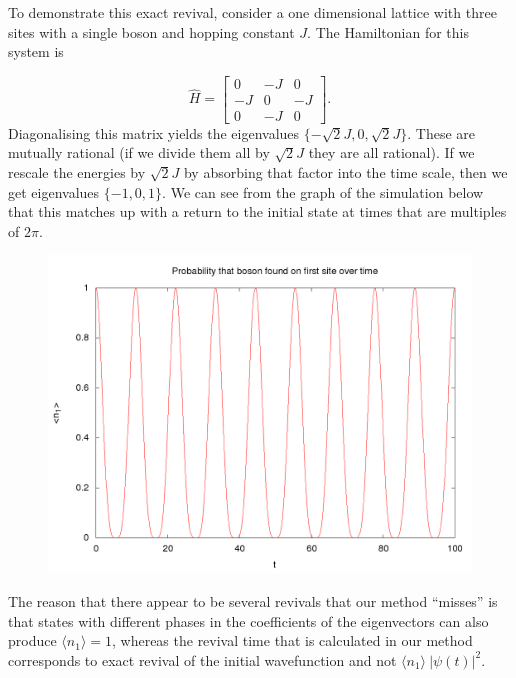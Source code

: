 \documentclass[a4paper,10pt]{article}
\begin{document}
To demonstrate this exact revival, consider a one dimensional lattice with three sites with a single boson and hopping constant $J$. The Hamiltonian for this system is

\begin{equation}
\hat{H}= \begin{bmatrix}
 0 & -J & 0 \\
 -J & 0 & -J\\
 0 & -J & 0
 \end{bmatrix}.
\end{equation}
Diagonalising this matrix yields the eigenvalues $\{-\sqrt{2}J,0,\sqrt{2}J\}$. These are mutually rational (if we divide them all by $\sqrt{2}J$ they are all rational). 
If we rescale the energies by $\sqrt{2}J$ by absorbing that factor into the time scale, then we get eigenvalues $\{-1,0,1\}$.
We can see from the graph of the simulation below that this matches up with a return to the initial state at times that are multiples of $2\pi$.

\begin{figure}[H]
 \begin{center}
 \includegraphics[width=1.0\textwidth]{showing_revival_3by1}
 \end{center}
\end{figure}

The reason that there appear to be several revivals that our method ``misses'' is that states with different phases in the coefficients of the eigenvectors can also produce $\langle n_1 \rangle =1$, whereas the revival time that is 
calculated in our method corresponds to exact revival of the initial wavefunction and not $\langle n_1 \rangle ~ |\psi(t)|^2$.
\end{document}
